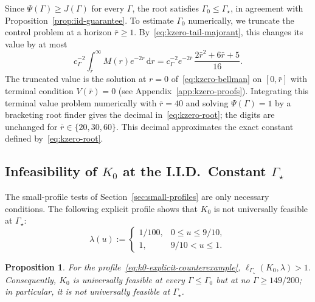 \documentclass[11pt]{article}
\newtheorem{proposition}[theorem]{Proposition}
\theoremstyle{definition}
\theoremstyle{remark}
\newcommand{\dd}{\,\mathrm d}
\begin{document}
Since $\Psi(\Gamma)\ge J(\Gamma)$ for every $\Gamma$, the root satisfies $\Gamma_0\le\Gamma_\star$, in agreement with Proposition~\ref{prop:iid-guarantee}. To estimate $\Gamma_0$ numerically, we truncate the control problem
at a horizon $\bar r\ge1$. By~\eqref{eq:kzero-tail-majorant},
this changes its value by at most
\begin{equation}\label{eq:kzero-truncation}
 c_\Gamma^{-2}\int_{\bar r}^\infty M(r)e^{-2r}\dd r
 =c_\Gamma^{-2}e^{-2\bar r}\,\frac{2\bar r^2+6\bar r+5}{16}.
\end{equation}
The truncated value is the solution at $r=0$ of~\eqref{eq:kzero-bellman} on $[0,\bar r]$ with terminal condition $V(\bar r)=0$ (see Appendix~\ref{app:kzero-proofs}).
Integrating this terminal value problem numerically with $\bar r=40$ and solving $\Psi(\Gamma)=1$ by a bracketing root finder gives the decimal in~\eqref{eq:kzero-root}; the digits are unchanged for $\bar r\in\{20,30,60\}$.
This decimal approximates the exact constant defined by~\eqref{eq:kzero-root}.

\subsection{Infeasibility of \texorpdfstring{$K_0$}{K0} at the I.I.D.\ Constant \texorpdfstring{$\Gamma_\star$}{Gamma-star}}
\label{sec:kzero-limit}

The small-profile tests of Section~\ref{sec:small-profiles} are only necessary conditions.
The following explicit profile shows that $K_0$ is not universally feasible at $\Gamma_\star$:
\begin{equation}\label{eq:k0-explicit-counterexample}
 \lambda(u):=
 \begin{cases}
  1/100,&0\le u\le9/10,\\
  1,&9/10<u\le1.
 \end{cases}
\end{equation}

\begin{proposition}\label{prop:k0-counterexample}
For the profile~\eqref{eq:k0-explicit-counterexample}, $\ell_{\Gamma_\star}(K_0,\lambda)>1$.
Consequently, $K_0$ is universally feasible at every $\Gamma\le\Gamma_0$ but at no $\Gamma\ge149/200$; in particular, it is not universally feasible at $\Gamma_\star$.
\end{proposition}
\end{document}

